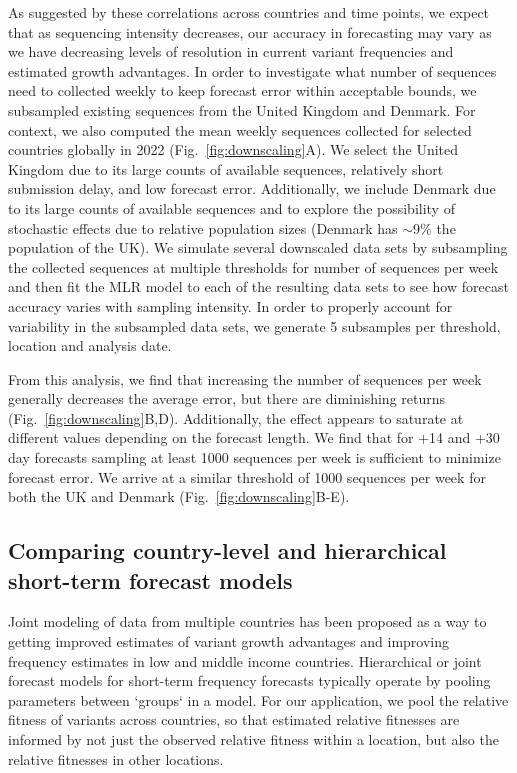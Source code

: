 \documentclass[11pt,oneside,letterpaper]{article}
\begin{document}
As suggested by these correlations across countries and time points, we expect that as sequencing intensity decreases, our accuracy in forecasting may vary as we have decreasing levels of resolution in current variant frequencies and estimated growth advantages.
In order to investigate what number of sequences need to collected weekly to keep forecast error within acceptable bounds, we subsampled existing sequences from the United Kingdom and Denmark.
For context, we also computed the mean weekly sequences collected for selected countries globally in 2022 (Fig.~\ref{fig:downscaling}A).
We select the United Kingdom due to its large counts of available sequences, relatively short submission delay, and low forecast error.
Additionally, we include Denmark due to its large counts of available sequences and to explore the possibility of stochastic effects due to relative population sizes (Denmark has $\sim$9\% the population of the UK).
We simulate several downscaled data sets by subsampling the collected sequences at multiple thresholds for number of sequences per week and then fit the MLR model to each of the resulting data sets to see how forecast accuracy varies with sampling intensity.
In order to properly account for variability in the subsampled data sets, we generate 5 subsamples per threshold, location and analysis date.

From this analysis, we find that increasing the number of sequences per week generally decreases the average error, but there are diminishing returns (Fig.~\ref{fig:downscaling}B,D).
Additionally, the effect appears to saturate at different values depending on the forecast length.
We find that for +14 and +30 day forecasts sampling at least 1000 sequences per week is sufficient to minimize forecast error.
We arrive at a similar threshold of 1000 sequences per week for both the UK and Denmark (Fig.~\ref{fig:downscaling}B-E).

\subsection*{Comparing country-level and hierarchical short-term forecast models}

Joint modeling of data from multiple countries has been proposed as a way to getting improved estimates of variant growth advantages and improving frequency estimates in low and middle income countries. 
Hierarchical or joint forecast models for short-term frequency forecasts typically operate by pooling parameters between `groups` in a model.
For our application, we pool the relative fitness of variants across countries, so that estimated relative fitnesses are informed by not just the observed relative fitness within a location, but also the relative fitnesses in other locations.
\end{document}
